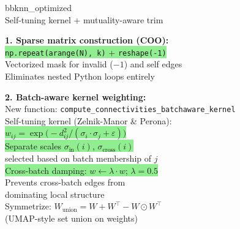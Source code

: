 \documentclass[8pt]{article}
\newlength{\colw}
\begin{document}
\hfill
\begin{minipage}[t]{\colw}
\begin{tcolorbox}[colback=hdrB, colframe=hdrB, fontupper=\bfseries\footnotesize\color{white},
    arc=2pt, left=2pt, right=2pt, top=1pt, bottom=1pt]
\centering bbknn\_optimized\\[-2pt]
{\scriptsize\mdseries Self-tuning kernel + mutuality-aware trim}
\end{tcolorbox}
\vspace{1pt}

\begin{keyboxG}
\textbf{1. Sparse matrix construction (COO):}\\
\colorbox{lightgreen}{\texttt{np.repeat(arange(N), k)} + \texttt{reshape(-1)}}\\
Vectorized mask for invalid ($-1$) and self edges\\
{\scriptsize\color{added} Eliminates nested Python loops entirely}
\end{keyboxG}\vspace{1pt}

\begin{keyboxG}
\textbf{2. Batch-aware kernel weighting:}\\
New function: \texttt{compute\_connectivities\_batchaware\_kernel}\\[2pt]
Self-tuning kernel (Zelnik-Manor \& Perona):\\
\colorbox{lightgreen}{$w_{ij} = \exp\!\big(-d_{ij}^2 / (\sigma_i \cdot \sigma_j + \varepsilon)\big)$}\\[2pt]
\colorbox{lightgreen}{Separate scales $\sigma_\text{in}(i)$, $\sigma_\text{cross}(i)$}\\
selected based on batch membership of $j$\\[2pt]
\colorbox{lightgreen}{Cross-batch damping: $w \gets \lambda \cdot w$; $\lambda = 0.5$}\\
{\scriptsize\color{added} Prevents cross-batch edges from\\
dominating local structure}\\[2pt]
Symmetrize: $W_\text{union} = W + W^\top - W \odot W^\top$\\
{\scriptsize (UMAP-style set union on weights)}
\end{keyboxG}\vspace{1pt}


\end{minipage}
\end{document}
